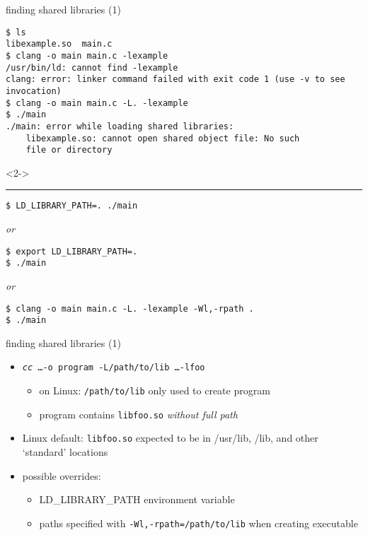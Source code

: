 
\begin{frame}[fragile,label=sharedLib]{finding shared libraries (1)}
\begin{Verbatim}[fontsize=\fontsize{11}{12}\selectfont]
$ ls
libexample.so  main.c
$ clang -o main main.c -lexample
/usr/bin/ld: cannot find -lexample
clang: error: linker command failed with exit code 1 (use -v to see invocation)
$ clang -o main main.c -L. -lexample
$ ./main
./main: error while loading shared libraries:
    libexample.so: cannot open shared object file: No such
    file or directory
\end{Verbatim}
\begin{visibleenv}<2->
\hrule
\begin{Verbatim}[fontsize=\fontsize{11}{12}\selectfont]
$ LD_LIBRARY_PATH=. ./main
\end{Verbatim}
\textit{or}
\begin{Verbatim}[fontsize=\fontsize{11}{12}\selectfont]
$ export LD_LIBRARY_PATH=.
$ ./main
\end{Verbatim}
\textit{or}
\begin{Verbatim}[fontsize=\fontsize{11}{12}\selectfont]
$ clang -o main main.c -L. -lexample -Wl,-rpath .
$ ./main
\end{Verbatim}
\end{visibleenv}
\end{frame}

\begin{frame}{finding shared libraries (1)}
    \begin{itemize}
    \item \texttt{\textit{cc} \ldots -o program -L/path/to/lib \ldots -lfoo}
        \begin{itemize}
        \item on Linux: \texttt{/path/to/lib} only used to create program
        \item program contains \texttt{libfoo.so} \textit{without full path}
        \end{itemize}
    \item Linux default: \texttt{libfoo.so} expected to be in /usr/lib, /lib, and other `standard' locations
    \item possible overrides:
        \begin{itemize}
        \item LD\_LIBRARY\_PATH environment variable
        \item paths specified with \texttt{-Wl,-rpath=/path/to/lib} when creating executable
        \end{itemize}
    \end{itemize}
\end{frame}

